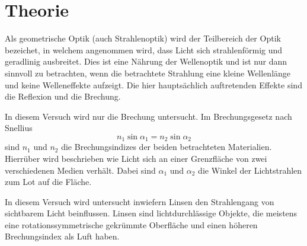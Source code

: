 \section{Theorie}
\label{sec:Theorie}

Als geometrische Optik (auch Strahlenoptik) wird der Teilbereich der Optik bezeichet, in welchem angenommen wird, dass Licht sich strahlenförmig und geradlinig ausbreitet.
Dies ist eine Nährung der Wellenoptik und ist nur dann sinnvoll zu betrachten, wenn die betrachtete Strahlung eine kleine Wellenlänge und keine Welleneffekte aufzeigt.
Die hier hauptsächlich auftretenden Effekte sind die Reflexion und die Brechung.

In diesem Versuch wird nur die Brechung untersucht.
Im Brechungsgesetz nach Snellius
\begin{equation}
    n_1 \sin \alpha_1 = n_2 \sin \alpha_2
    \label{eq:brechungsgesetz}
\end{equation}
sind $n_1$ und $n_2$ die Brechungsindizes der beiden betrachteten Materialien.
Hierrüber wird beschrieben wie Licht sich an einer Grenzfläche von zwei verschiedenen Medien verhält.
Dabei sind $\alpha_1$ und $\alpha_2$ die Winkel der Lichtstrahlen zum Lot auf die Fläche.

In diesem Versuch wird untersucht inwiefern Linsen den Strahlengang von sichtbarem Licht beinflussen.
Linsen sind lichtdurchlässige Objekte, die meistens eine rotationssymmetrische gekrümmte Oberfläche und einen höheren Brechungsindex als Luft haben.


